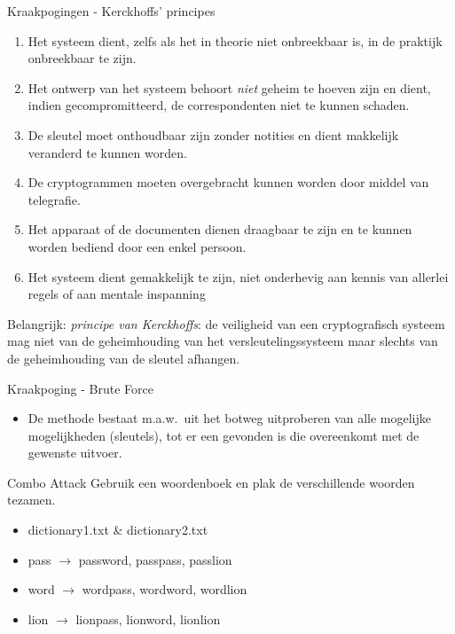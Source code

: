 \documentclass{beamer}
\begin{document}

\begin{frame}{Kraakpogingen - Kerckhoffs' principes}
	
	\begin{enumerate}
		\item Het systeem dient, zelfs als het in theorie niet onbreekbaar is, in de praktijk onbreekbaar te zijn. \pause
		\item \textcolor{HoGentAccent1}{Het ontwerp van het systeem behoort \emph{niet} geheim te hoeven zijn en dient, indien gecompromitteerd, de correspondenten niet te kunnen schaden.}\pause
		\item De sleutel moet onthoudbaar zijn zonder notities en dient makkelijk veranderd te kunnen worden.\pause
		\item De cryptogrammen moeten overgebracht kunnen worden door middel van telegrafie.\pause
		\item Het apparaat of de documenten dienen draagbaar te zijn en te kunnen worden bediend door een enkel persoon.\pause
		\item Het systeem dient gemakkelijk te zijn, niet onderhevig aan kennis van allerlei regels of aan mentale inspanning\pause
\end{enumerate}
	\textcolor{HoGentAccent1}{Belangrijk: \textit{principe van Kerckhoffs}}: de veiligheid van een cryptografisch systeem mag niet van de geheimhouding van het versleutelingssysteem maar slechts van de geheimhouding van de sleutel afhangen.

\end{frame}

\begin{frame}{Kraakpoging - Brute Force}

\begin{itemize}
	\item 	 De methode bestaat m.a.w.\ uit het botweg uitproberen van alle mogelijke mogelijkheden (sleutels), 
	 tot er een gevonden is die overeenkomt met de gewenste uitvoer.
\end{itemize}
\end{frame}

\begin{frame}{Combo Attack}
	Gebruik een woordenboek en plak de verschillende woorden tezamen.
	\begin{itemize}
		\item dictionary1.txt \& dictionary2.txt
		\item pass $ \rightarrow $ password, passpass, passlion
		\item word $ \rightarrow $ wordpass, wordword, wordlion
		\item lion $ \rightarrow $ lionpass, lionword, lionlion 
	\end{itemize}
\end{frame}
\end{document}
